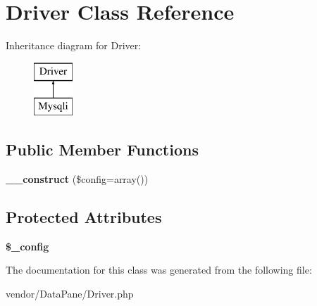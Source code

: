 \hypertarget{classDriver}{
\section{Driver Class Reference}
\label{classDriver}
}
Inheritance diagram for Driver:\begin{figure}[H]
\begin{center}
\leavevmode
\includegraphics[height=2.000000cm]{classDriver}
\end{center}
\end{figure}
\subsection*{Public Member Functions}
\begin{DoxyCompactItemize}
\item 
\hypertarget{classDriver_a8d88bcea3494918494e087f618f86b74}{
{\bfseries \_\-\_\-construct} (\$config=array())}
\label{classDriver_a8d88bcea3494918494e087f618f86b74}

\end{DoxyCompactItemize}
\subsection*{Protected Attributes}
\begin{DoxyCompactItemize}
\item 
\hypertarget{classDriver_aeb51eec05ef25c6f820856a36c9f42c6}{
{\bfseries \$\_\-config}}
\label{classDriver_aeb51eec05ef25c6f820856a36c9f42c6}

\end{DoxyCompactItemize}


The documentation for this class was generated from the following file:\begin{DoxyCompactItemize}
\item 
vendor/DataPane/Driver.php\end{DoxyCompactItemize}
